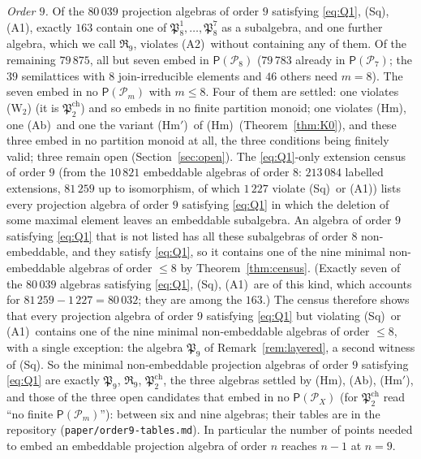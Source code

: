 \documentclass[11pt]{amsart}
\theoremstyle{definition}
\renewcommand{\P}{\mathcal{P}}      %
\newcommand{\PA}{\mathsf{P}}         %
\newcommand{\Wire}{\textup{(Sq)}}      %
\newcommand{\Rcond}{\textup{(A1)}}     %
\newcommand{\Rp}{\textup{(A2)}}        %
\newcommand{\Kzero}{\textup{(Hm)}}     %
\newcommand{\Hmp}{\textup{(Hm$'$)}}     %
\newcommand{\Kfour}{\textup{(Ab)}}     %
\newcommand{\Wn}[1][n]{\textup{(W$_{#1}$)}}
\begin{document}
\emph{Order $9$.} Of the $80\,039$ projection algebras of order $9$ satisfying \eqref{eq:Q1}, \Wire, \Rcond, exactly $163$ contain one of $\mathfrak P_8^1,\dots,\mathfrak P_8^7$ as a subalgebra, and one further algebra, which we call $\mathfrak R_9$, violates \Rp\ without containing any of them. Of the remaining $79\,875$, all but seven embed in $\PA(\P_8)$ ($79\,783$ already in $\PA(\P_7)$; the $39$ semilattices with $8$ join-irreducible elements and $46$ others need $m=8$). The seven embed in no $\PA(\P_m)$ with $m\le8$. Four of them are settled: one violates \Wn[2] (it is $\mathfrak P^{\mathrm{ch}}_2$) and so embeds in no finite partition monoid; one violates \Kzero, one \Kfour\ and one the variant \Hmp\ of \Kzero\ (Theorem~\ref{thm:K0}), and these three embed in no partition monoid at all, the three conditions being finitely valid; three remain open (Section~\ref{sec:open}). The \eqref{eq:Q1}-only extension census of order $9$ (from the $10\,821$ embeddable algebras of order $8$: $213\,084$ labelled extensions, $81\,259$ up to isomorphism, of which $1\,227$ violate \Wire\ or \Rcond) lists every projection algebra of order $9$ satisfying \eqref{eq:Q1} in which the deletion of some maximal element leaves an embeddable subalgebra. An algebra of order $9$ satisfying \eqref{eq:Q1} that is not listed has all these subalgebras of order $8$ non-embeddable, and they satisfy \eqref{eq:Q1}, so it contains one of the nine minimal non-embeddable algebras of order $\le8$ by Theorem~\ref{thm:census}. (Exactly seven of the $80\,039$ algebras satisfying \eqref{eq:Q1}, \Wire, \Rcond\ are of this kind, which accounts for $81\,259-1\,227=80\,032$; they are among the $163$.) The census therefore shows that every projection algebra of order $9$ satisfying \eqref{eq:Q1} but violating \Wire\ or \Rcond\ contains one of the nine minimal non-embeddable algebras of order $\le8$, with a single exception: the algebra $\mathfrak P_9$ of Remark~\ref{rem:layered}, a second witness of \Wire. So the minimal non-embeddable projection algebras of order $9$ satisfying \eqref{eq:Q1} are exactly $\mathfrak P_9$, $\mathfrak R_9$, $\mathfrak P^{\mathrm{ch}}_2$, the three algebras settled by \Kzero, \Kfour, \Hmp, and those of the three open candidates that embed in no $\PA(\P_X)$ (for $\mathfrak P^{\mathrm{ch}}_2$ read ``no finite $\PA(\P_m)$''): between six and nine algebras; their tables are in the repository (\texttt{paper/order9-tables.md}). In particular the number of points needed to embed an embeddable projection algebra of order $n$ reaches $n-1$ at $n=9$.
\end{document}
